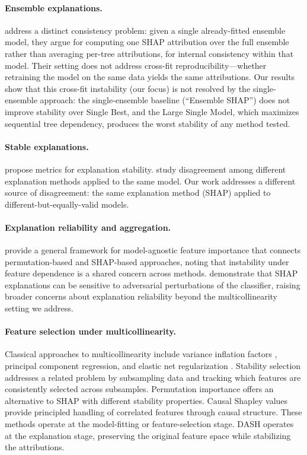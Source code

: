 \documentclass[11pt]{article}
\newcommand{\dash}{\textsc{DASH}}
\begin{document}
\paragraph{Ensemble explanations.}
\citet{paillard2025ensemble} address a distinct consistency problem:
given a single already-fitted ensemble model, they argue for computing
one SHAP attribution over the full ensemble rather than averaging
per-tree attributions, for internal consistency within that model.
Their setting does not address cross-fit reproducibility---whether
retraining the model on the same data yields the same attributions.
Our results show that this cross-fit instability (our focus) is
not resolved by the single-ensemble approach: the single-ensemble
baseline (``Ensemble SHAP'') does not improve stability over Single
Best, and the Large Single Model, which maximizes sequential
tree dependency, produces the worst stability of any method tested.

\paragraph{Stable explanations.}
\citet{alvarez2018towards} propose metrics for explanation stability.
\citet{krishna2022disagreement} study disagreement among different
explanation methods applied to the same model. Our work addresses a
different source of disagreement: the same explanation method (SHAP)
applied to different-but-equally-valid models.

\paragraph{Explanation reliability and aggregation.}
\citet{molnar2022general} provide a general framework for model-agnostic
feature importance that connects permutation-based and SHAP-based
approaches, noting that instability under feature dependence is a shared
concern across methods. \citet{slack2020fooling} demonstrate that
SHAP explanations can be sensitive to adversarial perturbations of the
classifier, raising broader concerns about explanation reliability
beyond the multicollinearity setting we address.

\paragraph{Feature selection under multicollinearity.}
Classical approaches to multicollinearity include variance inflation
factors \citep{obrien2007caution}, principal component regression, and
elastic net regularization \citep{zou2005regularization}. Stability
selection \citep{meinshausen2010stability} addresses a related problem
by subsampling data and tracking which features are consistently
selected across subsamples. Permutation importance
\citep{altmann2010permutation} offers an alternative to SHAP with
different stability properties. Causal Shapley values
\citep{heskes2020causal} provide principled handling of correlated
features through causal structure. These methods operate at the
model-fitting or feature-selection stage. \dash{} operates at the
explanation stage, preserving the original feature space while
stabilizing the attributions.
\end{document}
